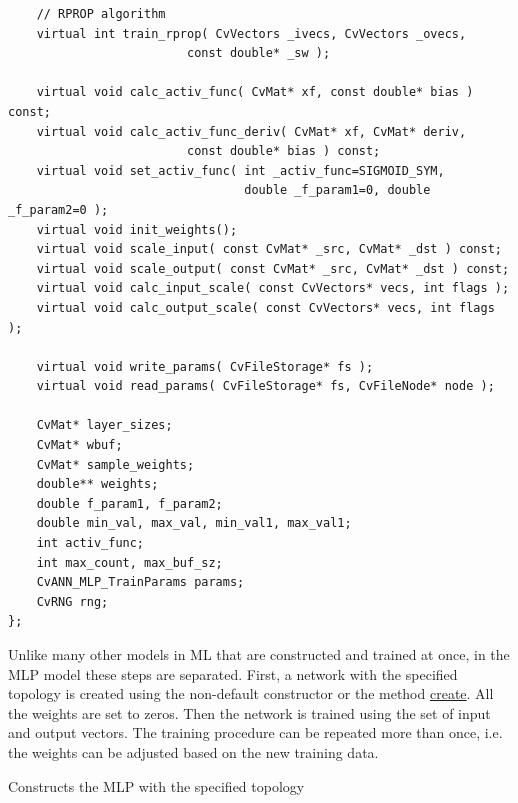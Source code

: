 \begin{lstlisting}
    // RPROP algorithm
    virtual int train_rprop( CvVectors _ivecs, CvVectors _ovecs, 
					     const double* _sw );

    virtual void calc_activ_func( CvMat* xf, const double* bias ) const;
    virtual void calc_activ_func_deriv( CvMat* xf, CvMat* deriv, 
					     const double* bias ) const;
    virtual void set_activ_func( int _activ_func=SIGMOID_SYM,
                                 double _f_param1=0, double _f_param2=0 );
    virtual void init_weights();
    virtual void scale_input( const CvMat* _src, CvMat* _dst ) const;
    virtual void scale_output( const CvMat* _src, CvMat* _dst ) const;
    virtual void calc_input_scale( const CvVectors* vecs, int flags );
    virtual void calc_output_scale( const CvVectors* vecs, int flags );

    virtual void write_params( CvFileStorage* fs );
    virtual void read_params( CvFileStorage* fs, CvFileNode* node );

    CvMat* layer_sizes;
    CvMat* wbuf;
    CvMat* sample_weights;
    double** weights;
    double f_param1, f_param2;
    double min_val, max_val, min_val1, max_val1;
    int activ_func;
    int max_count, max_buf_sz;
    CvANN_MLP_TrainParams params;
    CvRNG rng;
};
\end{lstlisting}

Unlike many other models in ML that are constructed and trained at once, in the MLP model these steps are separated. First, a network with the specified topology is created using the non-default constructor or the method \href{#CVANNMLP.3A.3Acreate}{create}. All the weights are set to zeros. Then the network is trained using the set of input and output vectors. The training procedure can be repeated more than once, i.e. the weights can be adjusted based on the new training data.



Constructs the MLP with the specified topology


\begin{description}
\end{description}

